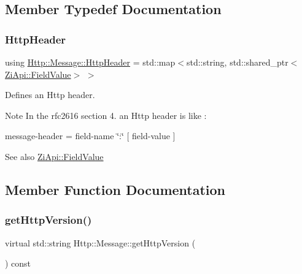 \subsection{Member Typedef Documentation}
\mbox{\label{classHttp_1_1Message_ae02720de7f072d0607fd217af6250989}} 
\subsubsection{\texorpdfstring{HttpHeader}{HttpHeader}}
{\footnotesize\ttfamily using \mbox{\hyperlink{classHttp_1_1Message_ae02720de7f072d0607fd217af6250989}{Http\+::\+Message\+::\+Http\+Header}} =  std\+::map$<$std\+::string, std\+::shared\+\_\+ptr$<$\mbox{\hyperlink{classZiApi_1_1FieldValue}{Zi\+Api\+::\+Field\+Value}}$>$ $>$}



Defines an Http header. 

\begin{DoxyNote}{Note}
In the rfc2616 section 4. an Http header is like \+: 

message-\/header = field-\/name \char`\"{}\+:\char`\"{} \mbox{[} field-\/value \mbox{]} 
\end{DoxyNote}
\begin{DoxySeeAlso}{See also}
\mbox{\hyperlink{classZiApi_1_1FieldValue}{Zi\+Api\+::\+Field\+Value}} 
\end{DoxySeeAlso}


\subsection{Member Function Documentation}
\mbox{\label{classHttp_1_1Message_aa0b031cb3fdab637c26a391efcb0f81e}} 
\subsubsection{\texorpdfstring{getHttpVersion()}{getHttpVersion()}}
{\footnotesize\ttfamily virtual std\+::string Http\+::\+Message\+::get\+Http\+Version (\begin{DoxyParamCaption}{ }\end{DoxyParamCaption}) const\hspace{0.3cm}{\ttfamily [pure virtual]}}



